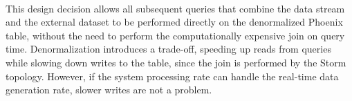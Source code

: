 \begin{table}[h!]
\centering
{}
\quad
{}
\\
\caption{Denormalization example}
\label{table:denormalization_example}
\end{table}

This design decision allows all subsequent queries that combine the data stream and the external dataset to be performed directly on the denormalized Phoenix table, without the need to perform the computationally expensive join on query time. Denormalization introduces a trade-off, speeding up reads from queries while slowing down writes to the table, since the join is performed by the Storm topology. However, if the system processing rate can handle the real-time data generation rate, slower writes are not a problem.


